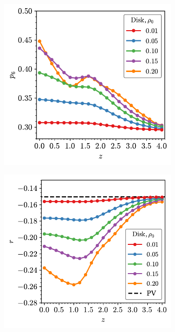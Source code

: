 \begin{figure}[bt]
     \vspace{2mm}
       \begin{subfigure}[b]{0.45\textwidth}
         \centering
         \includegraphics[width=\textwidth]{./figures/quasi2d/p6_z_3d_disk.pdf}
         \caption{}
         \label{fig:prc}
     \end{subfigure}
     \hfill
      \begin{subfigure}[b]{0.46\textwidth}
         \centering
         \includegraphics[width=\textwidth]{./figures/quasi2d/r_z_3d_disk.pdf}
         \caption{}
         \label{fig:prd}
     \end{subfigure}
     \hfill
     

\end{figure}
